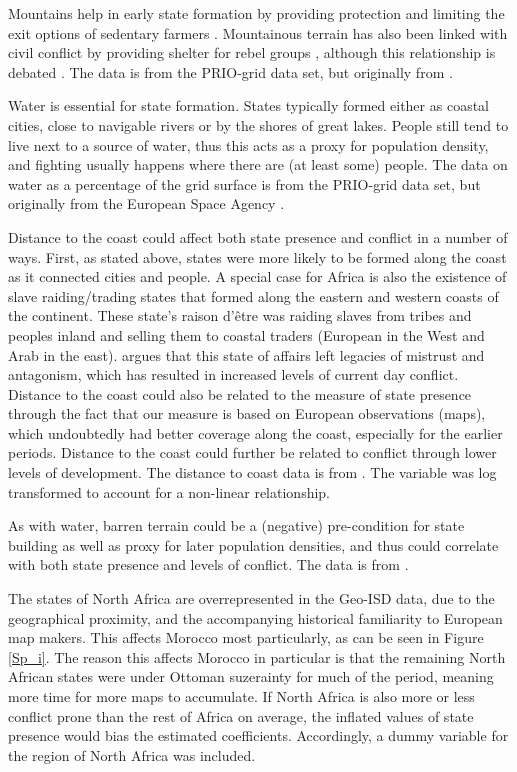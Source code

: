 \documentclass[12pt]{article}
\begin{document}
Mountains help in early state formation by providing protection and limiting the
exit options of sedentary farmers \citep{Carneiro1988}. Mountainous terrain has
also been linked with civil conflict by providing shelter for rebel groups
\citep{Hegre2006}, although this relationship is debated 
\citep{Buhaug2002}. The data is from the PRIO-grid data set, but originally 
from \citet{Blyth2002}. 

Water is essential for state formation. States typically formed either as
coastal cities, close to navigable rivers or by the shores of great lakes.
People still tend to live next to a source of water, thus this acts as a proxy
for population density, and fighting usually happens where there are (at least
some) people. The data on water as a percentage of the grid surface is from the
PRIO-grid data set, but originally from the European Space Agency
\citep{Bontemps2009}.

Distance to the coast could affect both state presence and conflict in a number
of ways. First, as stated above, states were more likely to be formed along the
coast as it connected cities and people. A special case for Africa is also the
existence of slave raiding/trading states that formed along the eastern and
western coasts of the continent. These state's raison d'être was raiding slaves
from tribes and peoples inland and selling them to coastal traders (European in
the West and Arab in the east). \citet{Nunn2008} argues that this state of
affairs left legacies of mistrust and antagonism, which has resulted in
increased levels of current day conflict. Distance to the coast could also be
related to the measure of state presence through the fact that our measure is
based on European observations (maps), which undoubtedly had better coverage
along the coast, especially for the earlier periods. Distance to the coast could
further be related to conflict through lower levels of development. The distance
to coast data is from \citet{Wessel1996}. The variable was log transformed to
account for a non-linear relationship.

As with water, barren terrain could be a (negative) pre-condition for state
building as well as proxy for later population densities, and thus could
correlate with both state presence and levels of conflict. The data is from
\citet{Bontemps2009}.

The states of North Africa are overrepresented in the Geo-ISD data, due to the
geographical proximity, and the accompanying historical familiarity to European
map makers. This affects Morocco most particularly, as can be seen in Figure
\ref{Sp_i}. The reason this affects Morocco in particular is that the remaining
North African states were under Ottoman suzerainty for much of the period,
meaning more time for more maps to accumulate. If North Africa is also more or less
conflict prone than the rest of Africa on average, the inflated values of state
presence would bias the estimated coefficients. Accordingly, a dummy variable
for the region of North Africa was included.
\end{document}
